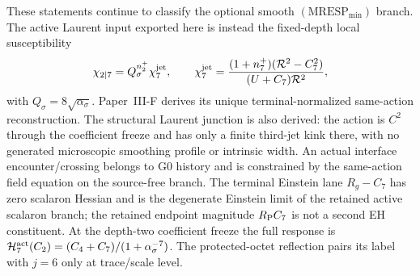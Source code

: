 \documentclass[12pt,a4paper]{article}
\begin{document}
These statements continue to classify the optional smooth
$(\mathrm{MRESP}_{\min})$ branch.  The active Laurent input exported here is
instead the fixed-depth local susceptibility
\[
 \chi_{2\mid7}=Q_\sigma^{n_2^+}\chi_7^{\rm jet},
 \qquad \chi_7^{\rm jet}
 =\frac{(1+n_7^+)(\mathcal R^2-C_7^2)}{(U+C_7)\mathcal R^2},
\]
with $Q_\sigma=8\sqrt{\alpha_\sigma}$.  Paper~III-F derives its unique
terminal-normalized same-action reconstruction.  The structural Laurent
junction is also derived: the action is $C^2$ through the coefficient freeze
and has only a finite third-jet kink there, with no generated microscopic
smoothing profile or intrinsic width.  An actual interface
encounter/crossing belongs to G0 history and is constrained by the same-action
field equation on the source-free branch.  The terminal
Einstein lane \(R_g-C_7\) has zero scalaron Hessian and is the degenerate
Einstein limit of the retained active scalaron branch;
the retained endpoint magnitude \(R_{\mathrm P} C_7\) is not a second EH constituent.
At the depth-two coefficient freeze the full response is
\(\mathcal H_7^{\rm act}(C_2)=(C_4+C_7)/(1+\alpha_\sigma^{-7})\).  The protected-octet
reflection pairs its label with \(j=6\) only at trace/scale level.
\end{document}
